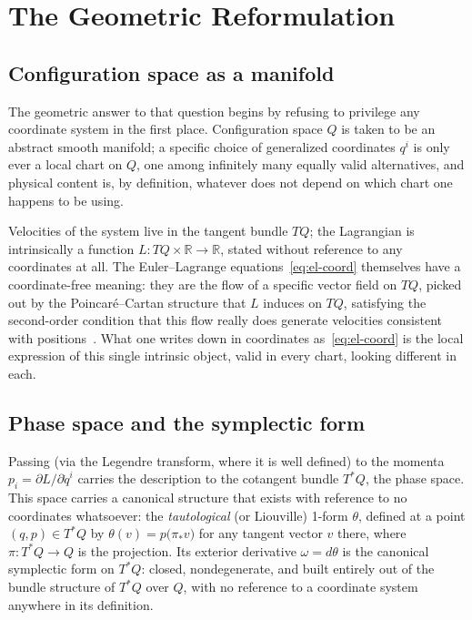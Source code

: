 \section{The Geometric Reformulation}
\label{sec:geometric-form}

\subsection{Configuration space as a manifold}

The geometric answer to that question begins by refusing to
privilege any coordinate system in the first place. Configuration
space $Q$ is taken to be an abstract smooth manifold; a specific
choice of generalized coordinates $q^i$ is only ever a local chart on
$Q$, one among infinitely many equally valid alternatives, and
physical content is, by definition, whatever does not depend on
which chart one happens to be using.

Velocities of the system live in the tangent bundle $TQ$; the
Lagrangian is intrinsically a function $L : TQ\times\mathbb R \to
\mathbb R$, stated without reference to any coordinates at all. The
Euler--Lagrange equations~\eqref{eq:el-coord} themselves have a
coordinate-free meaning: they are the flow of a specific vector field
on $TQ$, picked out by the Poincar\'e--Cartan structure that $L$
induces on $TQ$, satisfying the second-order condition that this
flow really does generate velocities consistent with
positions~\cite{AbrahamMarsden1978}. What one writes down in
coordinates as~\eqref{eq:el-coord} is the local expression of this
single intrinsic object, valid in every chart, looking different in
each.

\subsection{Phase space and the symplectic form}

Passing (via the Legendre transform, where it is well defined) to
the momenta $p_i = \partial L/\partial \dot q^i$ carries the
description to the cotangent bundle $T^*Q$, the phase space. This
space carries a canonical structure that exists with reference to no
coordinates whatsoever: the \emph{tautological} (or Liouville) 1-form
$\theta$, defined at a point $(q,p)\in T^*Q$ by $\theta(v) =
p\bigl(\pi_*v\bigr)$ for any tangent vector $v$ there, where $\pi:
T^*Q\to Q$ is the projection. Its exterior derivative $\omega =
d\theta$ is the canonical symplectic form on $T^*Q$: closed,
nondegenerate, and built entirely out of the bundle structure of
$T^*Q$ over $Q$, with no reference to a coordinate system anywhere in
its definition.

